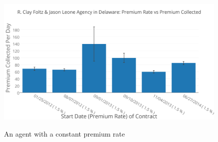 \documentclass{article}
\begin{document}
\begin{figure}[H]
\begin{center}
\includegraphics[width=.5\textwidth]{R_Clay_Foltz_&_Jason_Leone_Agency_in_Delaware-_Premium_Rate_vs_Premium_Collected.png}\\
\caption{An agent with a constant premium rate}
\end{center}
\end{figure}
\end{document}
